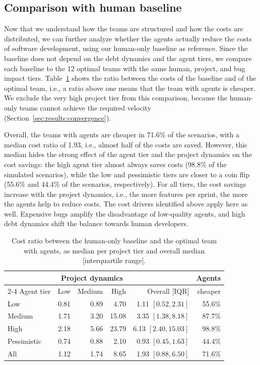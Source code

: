 \documentclass[smallextended]{svjour3}       %
\begin{document}
\subsection{Comparison with human baseline}
\label{sec:results:baseline}

Now that we understand how the teams are structured and how the costs are distributed, we can further analyze whether the agents actually reduce the costs of software development, using our human-only baseline as reference. Since the baseline does not depend on the debt dynamics and the agent tiers, we compare each baseline to the 12 optimal teams with the same human, project, and bug impact tiers. Table~\ref{tab:results:baseline} shows the ratio between the costs of the baseline and of the optimal team, i.e., a ratio above one means that the team with agents is cheaper. We exclude the very high project tier from this comparison, because the human-only teams cannot achieve the required velocity (Section~\ref{sec:results:convergence}). 

Overall, the teams with agents are cheaper in 71.6\% of the scenarios, with a median cost ratio of 1.93, i.e., almost half of the costs are saved. However, this median hides the strong effect of the agent tier and the project dynamics on the cost savings: the high agent tier almost always saves costs (98.8\% of the simulated scenarios), while the low and pessimistic tiers are closer to a coin flip (55.6\% and 44.4\% of the scenarios, respectively). For all tiers, the cost savings increase with the project dynamics, i.e., the more features per sprint, the more the agents help to reduce costs. The cost drivers identified above apply here as well. Expensive bugs amplify the disadvantage of low-quality agents, and high debt dynamics shift the balance towards human developers.


\begin{table}[t]
\caption{Cost ratio between the human-only baseline and the optimal team with agents, as median per project tier and overall median [interquartile range].}
\label{tab:results:baseline}
\footnotesize
\begin{tabularx}{\linewidth}{Xrrrrr}
\toprule
 & \multicolumn{3}{c}{Project dynamics} & & Agents \\
\cmidrule(lr){2-4}
Agent tier & Low & Medium & High & Overall [IQR] & cheaper \\
\midrule
Low         & 0.81 & 0.89 & 4.70  & 1.11 $[0.52, 2.31]$  & 55.6\% \\[2pt]
Medium      & 1.71 & 3.20 & 15.08 & 3.35 $[1.38, 8.18]$  & 87.7\% \\[2pt]
High        & 2.18 & 5.66 & 23.79 & 6.13 $[2.40, 15.03]$ & 98.8\% \\[2pt]
Pessimistic & 0.74 & 0.88 & 2.10  & 0.93 $[0.45, 1.63]$  & 44.4\% \\
\midrule
All         & 1.12 & 1.74 & 8.65  & 1.93 $[0.88, 6.50]$  & 71.6\% \\
\bottomrule
\end{tabularx}
\end{table}
\end{document}
